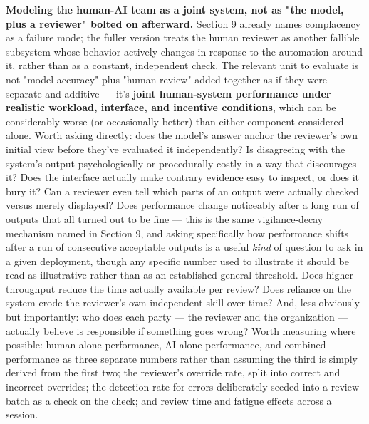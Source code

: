 \textbf{Modeling the human-AI team as a joint system, not as "the model, plus a reviewer" bolted on afterward.} Section 9 already names complacency as a failure mode; the fuller version treats the human reviewer as another fallible subsystem whose behavior actively changes in response to the automation around it, rather than as a constant, independent check. The relevant unit to evaluate is not "model accuracy" plus "human review" added together as if they were separate and additive --- it's \textbf{joint human-system performance under realistic workload, interface, and incentive conditions}, which can be considerably worse (or occasionally better) than either component considered alone. Worth asking directly: does the model's answer anchor the reviewer's own initial view before they've evaluated it independently? Is disagreeing with the system's output psychologically or procedurally costly in a way that discourages it? Does the interface actually make contrary evidence easy to inspect, or does it bury it? Can a reviewer even tell which parts of an output were actually checked versus merely displayed? Does performance change noticeably after a long run of outputs that all turned out to be fine --- this is the same vigilance-decay mechanism named in Section 9, and asking specifically how performance shifts after a run of consecutive acceptable outputs is a useful \emph{kind} of question to ask in a given deployment, though any specific number used to illustrate it should be read as illustrative rather than as an established general threshold. Does higher throughput reduce the time actually available per review? Does reliance on the system erode the reviewer's own independent skill over time? And, less obviously but importantly: who does each party --- the reviewer and the organization --- actually believe is responsible if something goes wrong? Worth measuring where possible: human-alone performance, AI-alone performance, and combined performance as three separate numbers rather than assuming the third is simply derived from the first two; the reviewer's override rate, split into correct and incorrect overrides; the detection rate for errors deliberately seeded into a review batch as a check on the check; and review time and fatigue effects across a session.

